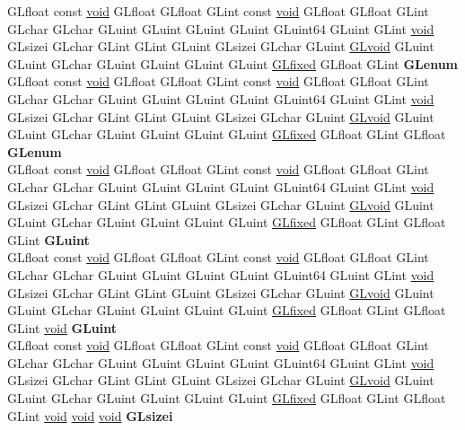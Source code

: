 \begin{DoxyCompactItemize}
\begin{tabbing}
\>GLfloat const \hyperlink{interfacevoid}{void} GLfloat GLfloat GLint const \hyperlink{interfacevoid}{void} GLfloat GLfloat GLint GLchar GLchar GLuint GLuint GLuint GLuint GLuint64 GLuint GLint \hyperlink{interfacevoid}{void} GLsizei GLchar GLint GLint GLuint GLsizei GLchar GLuint \hyperlink{interfacevoid}{GLvoid} GLuint GLuint GLchar GLuint GLuint GLuint GLuint \hyperlink{glheader_8h_ad6d3fa892df40dedf48ee6d84529ae5e}{GLfixed} GLfloat GLint {\bfseries GLenum}\\
\>GLfloat const \hyperlink{interfacevoid}{void} GLfloat GLfloat GLint const \hyperlink{interfacevoid}{void} GLfloat GLfloat GLint GLchar GLchar GLuint GLuint GLuint GLuint GLuint64 GLuint GLint \hyperlink{interfacevoid}{void} GLsizei GLchar GLint GLint GLuint GLsizei GLchar GLuint \hyperlink{interfacevoid}{GLvoid} GLuint GLuint GLchar GLuint GLuint GLuint GLuint \hyperlink{glheader_8h_ad6d3fa892df40dedf48ee6d84529ae5e}{GLfixed} GLfloat GLint GLfloat {\bfseries GLenum}\\
\>GLfloat const \hyperlink{interfacevoid}{void} GLfloat GLfloat GLint const \hyperlink{interfacevoid}{void} GLfloat GLfloat GLint GLchar GLchar GLuint GLuint GLuint GLuint GLuint64 GLuint GLint \hyperlink{interfacevoid}{void} GLsizei GLchar GLint GLint GLuint GLsizei GLchar GLuint \hyperlink{interfacevoid}{GLvoid} GLuint GLuint GLchar GLuint GLuint GLuint GLuint \hyperlink{glheader_8h_ad6d3fa892df40dedf48ee6d84529ae5e}{GLfixed} GLfloat GLint GLfloat GLint {\bfseries GLuint}\\
\>GLfloat const \hyperlink{interfacevoid}{void} GLfloat GLfloat GLint const \hyperlink{interfacevoid}{void} GLfloat GLfloat GLint GLchar GLchar GLuint GLuint GLuint GLuint GLuint64 GLuint GLint \hyperlink{interfacevoid}{void} GLsizei GLchar GLint GLint GLuint GLsizei GLchar GLuint \hyperlink{interfacevoid}{GLvoid} GLuint GLuint GLchar GLuint GLuint GLuint GLuint \hyperlink{glheader_8h_ad6d3fa892df40dedf48ee6d84529ae5e}{GLfixed} GLfloat GLint GLfloat GLint \hyperlink{interfacevoid}{void} {\bfseries GLuint}\\
\>GLfloat const \hyperlink{interfacevoid}{void} GLfloat GLfloat GLint const \hyperlink{interfacevoid}{void} GLfloat GLfloat GLint GLchar GLchar GLuint GLuint GLuint GLuint GLuint64 GLuint GLint \hyperlink{interfacevoid}{void} GLsizei GLchar GLint GLint GLuint GLsizei GLchar GLuint \hyperlink{interfacevoid}{GLvoid} GLuint GLuint GLchar GLuint GLuint GLuint GLuint \hyperlink{glheader_8h_ad6d3fa892df40dedf48ee6d84529ae5e}{GLfixed} GLfloat GLint GLfloat GLint \hyperlink{interfacevoid}{void} \hyperlink{interfacevoid}{void} \hyperlink{interfacevoid}{void} {\bfseries GLsizei}\\

\end{tabbing}
\end{DoxyCompactItemize}
